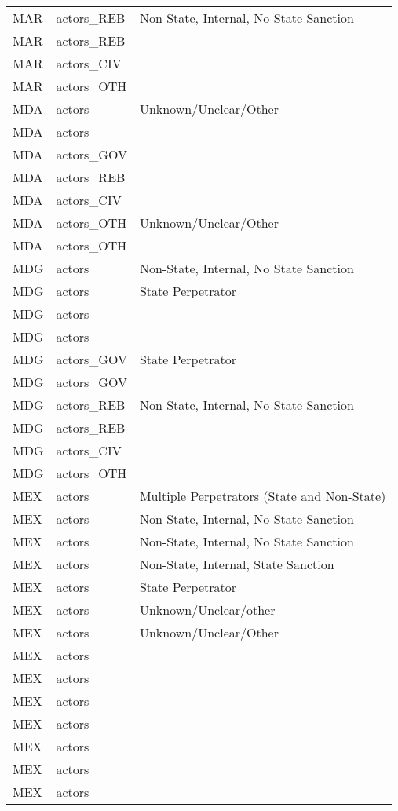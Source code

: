 \begin{table}[ht]
\begin{tabular}{lll}
  MAR & actors\_REB & Non-State, Internal, No State Sanction \\ 
  MAR & actors\_REB &  \\ 
  MAR & actors\_CIV &  \\ 
  MAR & actors\_OTH &  \\ 
  MDA & actors & Unknown/Unclear/Other \\ 
  MDA & actors &  \\ 
  MDA & actors\_GOV &  \\ 
  MDA & actors\_REB &  \\ 
  MDA & actors\_CIV &  \\ 
  MDA & actors\_OTH & Unknown/Unclear/Other \\ 
  MDA & actors\_OTH &  \\ 
  MDG & actors & Non-State, Internal, No State Sanction \\ 
  MDG & actors & State Perpetrator \\ 
  MDG & actors &  \\ 
  MDG & actors &  \\ 
  MDG & actors\_GOV & State Perpetrator \\ 
  MDG & actors\_GOV &  \\ 
  MDG & actors\_REB & Non-State, Internal, No State Sanction \\ 
  MDG & actors\_REB &  \\ 
  MDG & actors\_CIV &  \\ 
  MDG & actors\_OTH &  \\ 
  MEX & actors & Multiple Perpetrators (State and Non-State) \\ 
  MEX & actors & Non-State, Internal, No State Sanction \\ 
  MEX & actors & Non-State, Internal, No State Sanction \\ 
  MEX & actors & Non-State, Internal, State Sanction \\ 
  MEX & actors & State Perpetrator \\ 
  MEX & actors & Unknown/Unclear/other \\ 
  MEX & actors & Unknown/Unclear/Other \\ 
  MEX & actors &  \\ 
  MEX & actors &  \\ 
  MEX & actors &  \\ 
  MEX & actors &  \\ 
  MEX & actors &  \\ 
  MEX & actors &  \\ 
  MEX & actors &  \\ 

\end{tabular}
\end{table}
